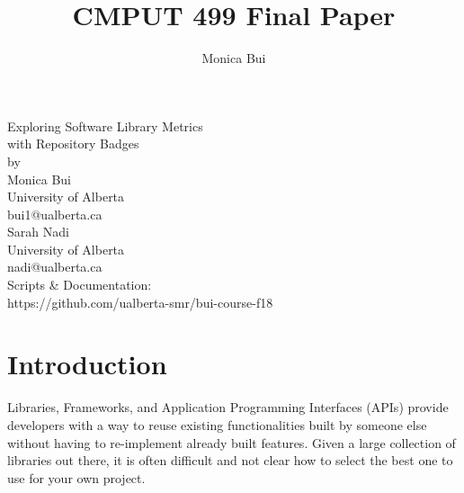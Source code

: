 \documentclass[12pt, letterpaper]{article}
\title{CMPUT 499 Final Paper}
\author{Monica Bui}
\begin{document}
\begin{titlepage}
    \centering
    \large
    \vspace{1cm}
    Exploring Software Library Metrics \\ 
    with Repository Badges \\
    \vspace{1cm}
    by \\
    \vspace{1cm}
    Monica Bui \\
    University of Alberta \\
    bui1@ualberta.ca \\
    \vspace{1cm}
    Sarah Nadi \\
    University of Alberta \\
    nadi@ualberta.ca \\
    \vspace{6cm}
    Scripts \& Documentation: \\
    https://github.com/ualberta-smr/bui-course-f18
\end{titlepage}

\tableofcontents

\listoffigures
\newpage

\section{Introduction} 

Libraries, Frameworks, and Application Programming Interfaces (APIs) provide developers with
a way to reuse existing functionalities
built by someone else without having to re-implement already built features. 
Given a large collection of libraries out there,
it is often difficult and not clear how to select the best one to use for your own project. 
\end{document}
